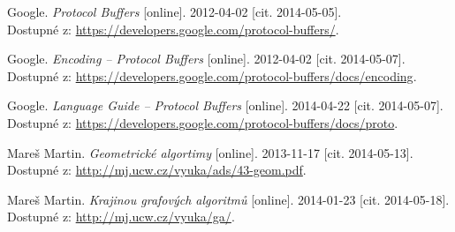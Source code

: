 \begin{thebibliography}{99}
	{\sc Google.}
	\emph{Protocol Buffers} [online]. 
	2012-04-02 [cit. 2014-05-05]. \\
	Dostupné z: \url{https://developers.google.com/protocol-buffers/}.

	{\sc Google.}
	\emph{Encoding -- Protocol Buffers} [online]. 
	2012-04-02 [cit. 2014-05-07]. \\
	Dostupné z: \url{https://developers.google.com/protocol-buffers/docs/encoding}.

	{\sc Google.}
	\emph{Language Guide -- Protocol Buffers} [online]. 
	2014-04-22 [cit. 2014-05-07]. \\
	Dostupné z:	\url{https://developers.google.com/protocol-buffers/docs/proto}.

	{\sc Mareš} Martin.
	\emph{Geometrické algortimy} [online]. 
	2013-11-17 [cit. 2014-05-13]. \\
	Dostupné z:	\url{http://mj.ucw.cz/vyuka/ads/43-geom.pdf}.

	{\sc Mareš} Martin.
	\emph{Krajinou grafových algoritmů} [online]. 
	2014-01-23 [cit. 2014-05-18]. \\
	Dostupné z:	\url{http://mj.ucw.cz/vyuka/ga/}.
	

\end{thebibliography}
